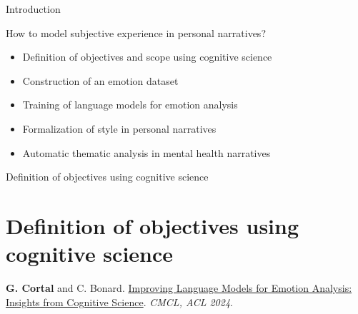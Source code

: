 \documentclass[10pt]{beamer}
\begin{document}
\begin{frame}{Introduction}

How to model subjective experience in personal narratives?

\vspace{0.5cm}
\pause

\begin{itemize}[<+->]
    \item Definition of objectives and scope using cognitive science
    \item Construction of an emotion dataset 
    \item Training of language models for emotion analysis 
    \item Formalization of style in personal narratives
    \item Automatic thematic analysis in mental health narratives %
\end{itemize}



    
\end{frame}

\begin{frame}{}
\Large
\begin{center}
    Definition of objectives using cognitive science
    \section{Definition of objectives using cognitive science}
\end{center}
\vspace{1.5cm}

    \footnotesize

    \textbf{G. Cortal} and C. Bonard. \href{https://aclanthology.org/2024.cmcl-1.23/}{Improving Language Models for Emotion Analysis: Insights from Cognitive Science}. \textit{CMCL, ACL 2024}.
\end{frame}
\end{document}

